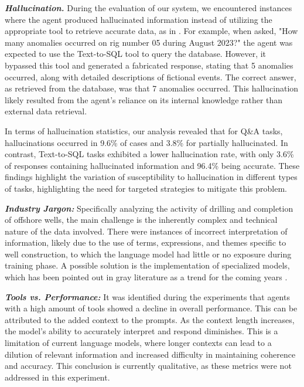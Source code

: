                 \textbf{\textit{Hallucination.}} 
                    During the evaluation of our system, we encountered instances where the agent produced hallucinated information instead of utilizing the appropriate tool to retrieve accurate data, as in \citep{Bilbao2023}. 
                    For example, when asked, "How many anomalies occurred on rig number 05 during August 2023?" the agent was expected to use the Text-to-SQL tool to query the database. 
                    However, it bypassed this tool and generated a fabricated response, stating that 5 anomalies occurred, along with detailed descriptions of fictional events. The correct answer, as retrieved from the database, was that 7 anomalies occurred. This hallucination likely resulted from the agent's reliance on its internal knowledge rather than external data retrieval. 

                    In terms of hallucination statistics, our analysis revealed that for Q\&A tasks, hallucinations occurred in 9.6\% of cases and 3.8\% for partially hallucinated. 
                    In contrast, Text-to-SQL tasks exhibited a lower hallucination rate, with only 3.6\% of responses containing hallucinated information and 96.4\% being accurate. 
                    These findings highlight the variation of susceptibility to hallucination in different types of tasks, highlighting the need for targeted strategies to mitigate this problem.
                
                \textbf{\textit{Industry Jargon:}}
                    Specifically analyzing the activity of drilling and completion of offshore wells, the main challenge is the inherently complex and technical nature of the data involved. 
                    There were instances of incorrect interpretation of information, likely due to the use of terms, expressions, and themes specific to well construction, to which the language model had little or no exposure during training phase. 
                    A possible solution is the implementation of specialized models, which has been pointed out in gray literature as a trend for the coming years \citep{Shah2024, Meena2023, Ghosh2023}.
                
                \textbf{\textit{Tools vs. Performance:}} 
                    It was identified during the experiments that agents with a high amount of tools showed a decline in overall performance. 
                    This can be attributed to the added context to the prompts. 
                    As the context length increases, the model's ability to accurately interpret and respond diminishes.
                    This is a limitation of current language models, where longer contexts can lead to a dilution of relevant information and increased difficulty in maintaining coherence and accuracy. 
                    This conclusion is currently qualitative, as these metrics were not addressed in this experiment.

